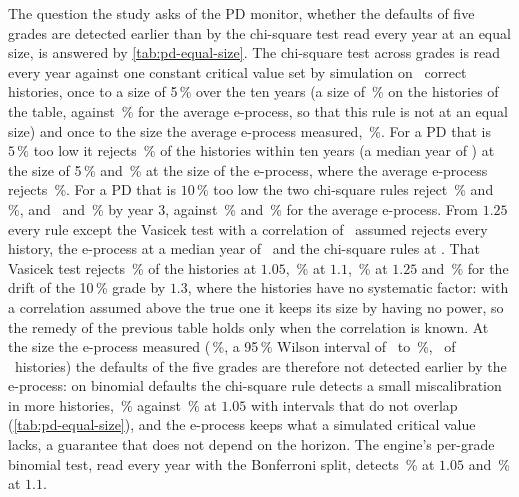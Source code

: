 

The question the study asks of the PD monitor, whether the defaults of five grades are detected earlier than by the chi-square test read every year at an equal size, is answered by \cref{tab:pd-equal-size}. The chi-square test across grades is read every year against one constant critical value set by simulation on \nPdcCalReps\ correct histories, once to a size of 5\,\% over the ten years (a size of \nPdcOneChiSim\,\% on the histories of the table, against \nPdOneAvg\,\% for the average e-process, so that this rule is not at an equal size) and once to the size the average e-process measured, \nPdcMatchedSize\,\%. For a PD that is $5\,\%$ too low it rejects \nPdcOneZeroFiveChiSim\,\% of the histories within ten years (a median year of \nPdcOneZeroFiveChiSimYear) at the size of 5\,\% and \nPdcOneZeroFiveChiMatched\,\% at the size of the e-process, where the average e-process rejects \nPdOneZeroFiveAvg\,\%. For a PD that is $10\,\%$ too low the two chi-square rules reject \nPdcOneOneChiSim\,\% and \nPdcOneOneChiMatched\,\%, and \nPdcOneOneChiSimBy\ and \nPdcOneOneChiMatchedBy\,\% by year 3, against \nPdOneOneAvg\,\% and \nPdcOneOneAvgBy\,\% for the average e-process. From $1.25$ every rule except the Vasicek test with a correlation of \nPdcAssumedRho\ assumed rejects every history, the e-process at a median year of \nPdcOneTwoFiveAvgYear\ and the chi-square rules at \nPdcOneTwoFiveChiSimYear. That Vasicek test rejects \nPdcOneZeroFiveVasAssumedEvery\,\% of the histories at $1.05$, \nPdcOneOneVasAssumedEvery\,\% at $1.1$, \nPdcOneTwoFiveVasAssumedEvery\,\% at $1.25$ and \nPdcGradeVasAssumedEvery\,\% for the drift of the 10\,\% grade by $1.3$, where the histories have no systematic factor: with a correlation assumed above the true one it keeps its size by having no power, so the remedy of the previous table holds only when the correlation is known. At the size the e-process measured (\nPdcMatchedSize\,\%, a 95\,\% Wilson interval of \nPdcMatchedSizeLo\ to \nPdcMatchedSizeHi\,\%, \nPdcMatchedSizeCount\ of \nPdcMatchedSizeN\ histories) the defaults of the five grades are therefore not detected earlier by the e-process: on binomial defaults the chi-square rule detects a small miscalibration in more histories, \nPdcOneZeroFiveChiMatched\,\% against \nPdOneZeroFiveAvg\,\% at $1.05$ with intervals that do not overlap (\cref{tab:pd-equal-size}), and the e-process keeps what a simulated critical value lacks, a guarantee that does not depend on the horizon. The engine's per-grade binomial test, read every year with the Bonferroni split, detects \nPdcOneZeroFiveBinEvery\,\% at $1.05$ and \nPdcOneOneBinEvery\,\% at $1.1$.

